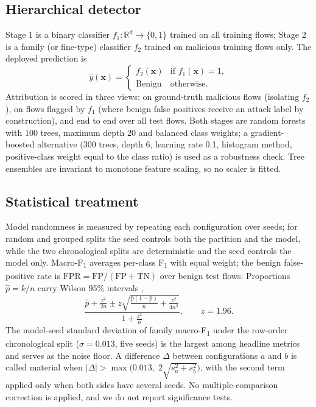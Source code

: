 \documentclass[conference]{IEEEtran}
\newcommand{\Fone}{F\textsubscript{1}}
\begin{document}
\subsection{Hierarchical detector}
Stage 1 is a binary classifier $f_1:\mathbb{R}^d\rightarrow\{0,1\}$ trained on all training flows; Stage 2 is a family (or fine-type) classifier $f_2$ trained on malicious training flows only. The deployed prediction is
\begin{equation}
\hat{y}(\mathbf{x})=\begin{cases} f_2(\mathbf{x}) & \text{if } f_1(\mathbf{x})=1,\\ \text{Benign} & \text{otherwise.}\end{cases}
\end{equation}
Attribution is scored in three views: on ground-truth malicious flows (isolating $f_2$), on flows flagged by $f_1$ (where benign false positives receive an attack label by construction), and end to end over all test flows. Both stages are random forests \cite{breiman2001} with 100 trees, maximum depth 20 and balanced class weights; a gradient-boosted alternative \cite{chen2016} (300 trees, depth 6, learning rate 0.1, histogram method, positive-class weight equal to the class ratio) is used as a robustness check. Tree ensembles are invariant to monotone feature scaling, so no scaler is fitted.

\subsection{Statistical treatment}
Model randomness is measured by repeating each configuration over seeds; for random and grouped splits the seed controls both the partition and the model, while the two chronological splits are deterministic and the seed controls the model only. Macro-\Fone{} averages per-class \Fone{} with equal weight; the benign false-positive rate is $\mathrm{FPR}=\mathrm{FP}/(\mathrm{FP}+\mathrm{TN})$ over benign test flows. Proportions $\hat p=k/n$ carry Wilson 95\% intervals \cite{wilson1927},
\begin{equation}
\frac{\hat p+\frac{z^2}{2n}\pm z\sqrt{\frac{\hat p(1-\hat p)}{n}+\frac{z^2}{4n^2}}}{1+\frac{z^2}{n}},\qquad z=1.96 .
\end{equation}
The model-seed standard deviation of family macro-\Fone{} under the row-order chronological split ($\sigma=0.013$, five seeds) is the largest among headline metrics and serves as the noise floor. A difference $\Delta$ between configurations $a$ and $b$ is called material when $|\Delta|>\max\bigl(0.013,\;2\sqrt{s_a^2+s_b^2}\bigr)$, with the second term applied only when both sides have several seeds. No multiple-comparison correction is applied, and we do not report significance tests.
\end{document}
